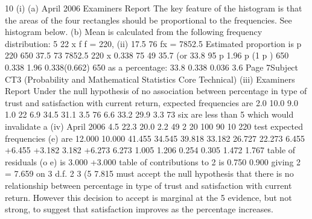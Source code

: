 10
(i)
(a)
April 2006
Examiners Report
The key feature of the histogram is that the areas of the four rectangles
should be proportional to the frequencies.
See histogram below.
(b)
Mean is calculated from the following frequency distribution:
5
22
x
f
f = 220,
(ii)
17.5
76
fx = 7852.5
Estimated proportion is p
220
650
37.5
73
7852.5
220
x
0.338
75
49
35.7%
(or 33.8%
95%
p 1.96
p (1 p )
650
0.338 1.96
0.338(0.662)
650
as a percentage: 33.8%
0.338 0.036
3.6%
Page 7Subject CT3 (Probability and Mathematical Statistics Core Technical)
(iii)
Examiners Report
Under the null hypothesis of no association between percentage in type of trust
and satisfaction with current return, expected frequencies are
2.0
10.0
9.0
1.0
22
6.9
34.5
31.1
3.5
76
6.6
33.2
29.9
3.3
73
six are less than 5 which would invalidate a
(iv)
April 2006
4.5
22.3
20.0
2.2
49
2
20
100
90
10
220
test
expected frequencies (e) are
12.000
10.000
41.455
34.545 39.818
33.182 26.727
22.273
6.455
+6.455 +3.182
3.182 +6.273
6.273
1.005
1.206 0.254
0.305 1.472
1.767
table of residuals (o e) is
3.000
+3.000
table of contributions to
2
is
0.750
0.900
giving
2
= 7.659 on 3 d.f.
2
3 (5%
7.815
must accept the null hypothesis that there is no
relationship between percentage in type of trust and satisfaction with current
return.
However this decision to accept is marginal at the 5%
evidence, but not strong, to suggest that satisfaction improves as the
percentage increases.

